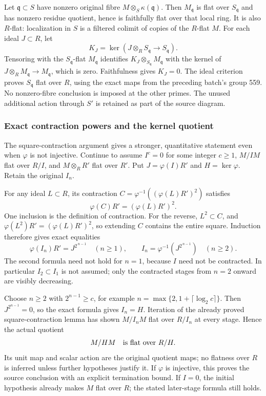 Let \(\mathfrak q\subset S\) have nonzero original fibre \(M\otimes_S\kappa(\mathfrak q)\). Then \(M_{\mathfrak q}\) is flat over \(S_{\mathfrak q}\) and has nonzero residue quotient, hence is faithfully flat over that local ring. It is also \(R\)-flat: localization in \(S\) is a filtered colimit of copies of the \(R\)-flat \(M\). For each ideal \(J\subset R\), let \[
K_J=\ker(J\otimes_RS_{\mathfrak q}\to S_{\mathfrak q}).
\] Tensoring with the \(S_{\mathfrak q}\)-flat \(M_{\mathfrak q}\) identifies \(K_J\otimes_{S_{\mathfrak q}}M_{\mathfrak q}\) with the kernel of \(J\otimes_RM_{\mathfrak q}\to M_{\mathfrak q}\), which is zero. Faithfulness gives \(K_J=0\). The ideal criterion proves \(S_{\mathfrak q}\) flat over \(R\), using the exact maps from the preceding batch's group 559. No nonzero-fibre conclusion is imposed at the other primes. The unused additional action through \(S'\) is retained as part of the source diagram.

\subsubsection{Exact contraction powers and the kernel quotient}\label{exact-contraction-powers-and-the-kernel-quotient}

The square-contraction argument gives a stronger, quantitative statement even when \(\varphi\) is not injective. Continue to assume \(I^c=0\) for some integer \(c\geq1\), \(M/IM\) flat over \(R/I\), and \(M\otimes_RR'\) flat over \(R'\). Put \(J=\varphi(I)R'\) and \(H=\ker\varphi\). Retain the original \(I_n\).

For any ideal \(L\subset R\), its contraction \(C=\varphi^{-1}((\varphi(L)R')^2)\) satisfies \[
\varphi(C)R'=(\varphi(L)R')^2.
\] One inclusion is the definition of contraction. For the reverse, \(L^2\subset C\), and \(\varphi(L^2)R'=(\varphi(L)R')^2\), so extending \(C\) contains the entire square. Induction therefore gives exact equalities \[
\varphi(I_n)R'=J^{2^{\,n-1}}\quad(n\geq1),
\qquad
I_n=\varphi^{-1}(J^{2^{\,n-1}})\quad(n\geq2).
\] The second formula need not hold for \(n=1\), because \(I\) need not be contracted. In particular \(I_2\subset I_1\) is not assumed; only the contracted stages from \(n=2\) onward are visibly decreasing.

Choose \(n\geq2\) with \(2^{n-1}\geq c\), for example \(n=\max\{2,1+\lceil\log_2c\rceil\}\). Then \(J^{2^{n-1}}=0\), so the exact formula gives \(I_n=H\). Iteration of the already proved square-contraction lemma has shown \(M/I_nM\) flat over \(R/I_n\) at every stage. Hence the actual quotient \[
M/HM\quad\hbox{is flat over }R/H.
\] Its unit map and scalar action are the original quotient maps; no flatness over \(R\) is inferred unless further hypotheses justify it. If \(\varphi\) is injective, this proves the source conclusion with an explicit termination bound. If \(I=0\), the initial hypothesis already makes \(M\) flat over \(R\); the stated later-stage formula still holds.

